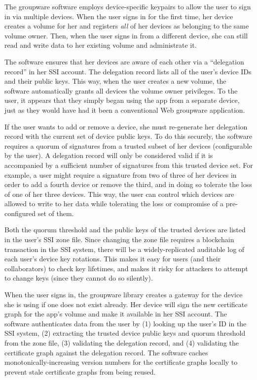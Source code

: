 The groupware software employs device-specific keypairs to allow the user to
sign in via multiple devices.  When the user signs in for the first time, her
device creates a volume for her and registers \emph{all} of her devices as
belonging to the same volume owner.  Then, when the user signs in from a different device, she can
still read and write data to her existing volume and administrate it.

The software ensures that her devices are aware of each other via a
``delegation record'' in her SSI account.  The delegation record lists all of
the user's device IDs and their public keys.  This way, when the user creates a
new volume, the software automatically grants all devices the volume owner
privileges.  To the user, it appears that they simply began using the app from a
separate device, just as they would have had it been a conventional Web
groupware application.

If the user wants to add or remove a device, she must re-generate her delegation
record with the current set of device public keys.
To do this securely, the software requires a quorum of signatures from a trusted
subset of her devices (configurable by the user).
A delegation record will only be considered valid if it
is accompanied by a sufficient number of signatures from this trusted device
set.  For example, a user might require a signature from two of three of her
devices in order to add a fourth device or remove the third, and in doing so
tolerate the loss of one of her three devices.  This way, the user can control
which devices are allowed to write to her data while tolerating the loss or
compromise of a pre-configured set of them.

Both the quorum threshold and the public keys of the
trusted devices are listed in the user's SSI zone file.  Since changing the zone
file requires a blockchain transaction in the SSI system, there will be a
widely-replicated auditable log of each user's device key rotations.  This makes it
easy for users (and their collaborators) to check key lifetimes, and makes it
risky for attackers to attempt to change keys (since they cannot do so
silently).

When the user signs in, the groupware library creates a gateway for the device
she is using if one does not exist already.  Her device will sign the
new certificate graph for the app's volume and make it available in her SSI account.  The
software authenticates data from the user by (1) looking up the user's ID in the
SSI system, (2) extracting the trusted device public keys and quorum threshold
from the zone file, (3) validating the delegation record, and (4) validating the
certificate graph against the delegation record.  The software caches
monotonically-increasing version numbers for the certificate graphs locally to
prevent stale certificate graphs from being reused.

